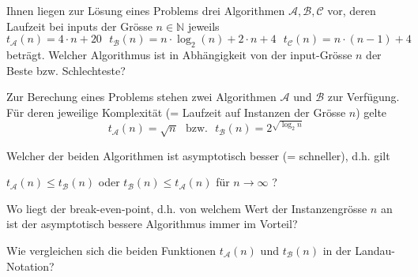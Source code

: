 
\begin{flushenum}
\item
Ihnen liegen zur Lösung eines Problems drei
Algorithmen $\mathcal{A}, \mathcal{B}, \mathcal{C}$
vor, deren Laufzeit bei inputs der Grösse $n \in \mathbb{N}$
jeweils
\[
t_{\mathcal{A}}(n) = 4 \cdot n + 20~~~
t_{\mathcal{B}}(n) = n \cdot \log_2(n) + 2 \cdot n + 4~~~
t_{\mathcal{C}}(n) = n \cdot (n-1) + 4
\]
beträgt.
Welcher Algorithmus ist in Abhängigkeit von der
input-Grösse $n$ der Beste bzw. Schlechteste?

\item

Zur Berechung eines Problems stehen zwei Algorithmen $\mathcal{A}$ und
$\mathcal{B}$ zur Verfügung. Für deren jeweilige Komplexität (= Laufzeit auf
Instanzen der Grösse $n$) gelte
\[
t_\mathcal{A}(n) = \sqrt{n}~~~\text{bzw.}~~~t_\mathcal{B}(n) = 2^{\sqrt{\log_2 n}}
\]
\begin{flushalpha}
\item
Welcher der beiden Algorithmen ist asymptotisch besser (= schneller), d.h. gilt

$t_\mathcal{A}(n) \leq t_\mathcal{B}(n)$ oder 
$t_\mathcal{B}(n) \leq t_\mathcal{A}(n)$ für $n \rightarrow{\infty}$ ?
\item
Wo liegt der break-even-point, d.h. von welchem Wert der Instanzengrösse $n$ an ist der
asymptotisch bessere Algorithmus immer im Vorteil?
\item
Wie vergleichen sich die beiden Funktionen $t_\mathcal{A}(n)$ und $t_\mathcal{B}(n)$
in der Landau-Notation?
\end{flushalpha}

\end{flushenum}
 
